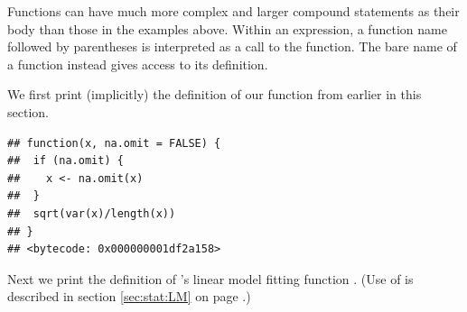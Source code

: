 \documentclass[krantz2]{krantz}\usepackage{knitr}
\begin{document}
Functions can have much more complex and larger compound statements as their body than those in the examples above. Within an expression, a function name followed by parentheses is interpreted as a call to the function. The bare name of a function instead gives access to its definition.

We first print (implicitly) the definition of our function from earlier in this section.

\begin{knitrout}\footnotesize
{}\color{fgcolor}\begin{kframe}
\begin{alltt}
\end{alltt}
\begin{verbatim}
## function(x, na.omit = FALSE) {
##  if (na.omit) {
##    x <- na.omit(x)
##  }
##  sqrt(var(x)/length(x))
## }
## <bytecode: 0x000000001df2a158>
\end{verbatim}
\end{kframe}
\end{knitrout}

Next we print the definition of \Rlang's linear model fitting function . (Use of  is described in section \ref{sec:stat:LM} on page \pageref{sec:stat:LM}.)
\end{document}

